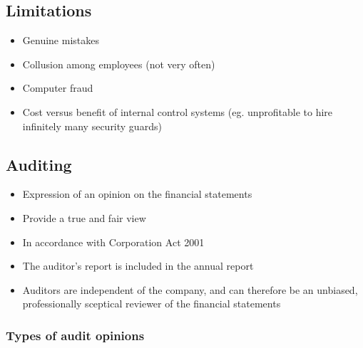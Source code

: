 \documentclass{article}
\begin{document}
	\subsection{Limitations}

		\begin{itemize}
			\item Genuine mistakes
			\item Collusion among employees (not very often)
			\item Computer fraud
			\item Cost versus benefit of internal control systems (eg. unprofitable to hire infinitely many security guards)
		\end{itemize}

	
	\subsection{Auditing}

		\begin{itemize}
			\item Expression of an opinion on the financial statements
			\item Provide a true and fair view
			\item In accordance with Corporation Act 2001
			\item The auditor's report is included in the annual report
		\end{itemize}

		\begin{itemize}
			\item Auditors are independent of the company, and can therefore be an unbiased, professionally sceptical reviewer of the financial statements
		\end{itemize}
		
		\subsubsection{Types of audit opinions}
\end{document}
